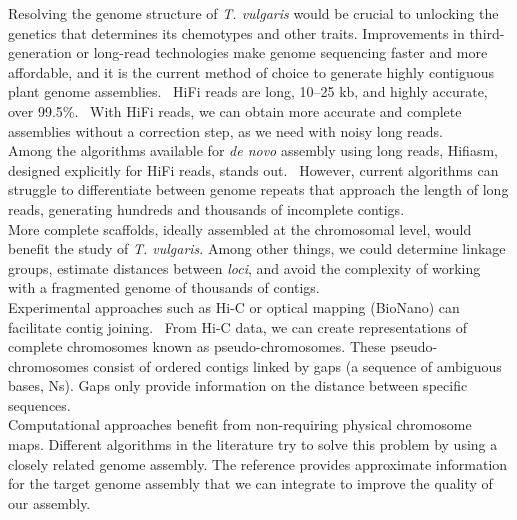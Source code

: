 Resolving the genome structure of \textit{T. vulgaris} would be crucial to unlocking the genetics that determines its chemotypes and other traits. Improvements in third-generation or long-read technologies make genome sequencing faster and more affordable, and it is the current method of choice to generate highly contiguous plant genome assemblies.~\cite{puckerPlantGenomeSequence2022} \ac{HiFi} reads are long, 10–25 kb, and highly accurate, over 99.5\%.~\cite{honHighlyAccurateLongread2020} With \ac{HiFi} reads, we can obtain more accurate and complete assemblies without a correction step, as we need with noisy long reads.~\cite{puckerPlantGenomeSequence2022}\\

Among the algorithms available for \textit{de novo} assembly using long reads, Hifiasm, designed explicitly for \ac{HiFi} reads, stands out.~\cite{chengHaplotyperesolvedNovoAssembly2021} However, current algorithms can struggle to differentiate between genome repeats that approach the length of long reads, generating hundreds and thousands of incomplete contigs.~\cite{huangAlignGraph2SimilarGenomeassisted2021} \\

More complete scaffolds, ideally assembled at the chromosomal level, would benefit the study of \textit{T. vulgaris}. Among other things, we could determine linkage groups, estimate distances between \textit{loci}, and avoid the complexity of working with a fragmented genome of thousands of contigs.~\cite{tamazianChromosomerReferencebasedGenome2016}\\

Experimental approaches such as \ac{Hi-C} or optical mapping (BioNano) can facilitate contig joining.~\cite{jungToolsStrategiesLongRead2019} From \ac{Hi-C} data, we can create representations of complete chromosomes known as pseudo-chromosomes. These pseudo-chromosomes consist of ordered contigs linked by gaps (a sequence of ambiguous bases, Ns). Gaps only provide information on the distance between specific sequences. ~\cite{puckerPlantGenomeSequence2022}\\

Computational approaches benefit from non-requiring physical chromosome maps. Different algorithms in the literature try to solve this problem by using a closely related genome assembly. The reference provides approximate information for the target genome assembly that we can integrate to improve the quality of our assembly.~\cite{huangAlignGraph2SimilarGenomeassisted2021}\\

